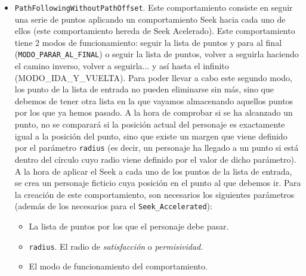 \begin{itemize}
 \item \texttt{PathFollowingWithoutPathOffset}. Este comportamiento consiste en seguir una serie de puntos aplicando un comportamiento Seek hacia cada uno de ellos (este comportamiento hereda de Seek Acelerado). Este comportamiento tiene 2 modos de funcionamiento: seguir la lista de puntos y para al final (\texttt{MODO\_PARAR\_AL\_FINAL}) o seguir la lista de puntos, volver a seguirla haciendo el camino inverso, volver a seguirla... y así hasta el infinito (MODO\_IDA\_Y\_VUELTA). Para poder llevar a cabo este segundo modo, los punto de la lista de entrada no pueden eliminarse sin más, sino que debemos de tener otra lista en la que vayamos almacenando aquellos puntos por los que ya hemos pasado. A la hora de comprobar si se ha alcanzado un punto, no se comparará si la posición actual del personaje es exactamente igual a la posición del punto, sino que existe un margen que viene definido por el parámetro \texttt{radius} (es decir, un personaje ha llegado a un punto si está dentro del círculo cuyo radio viene definido por el valor de dicho parámetro). A la hora de aplicar el Seek a cada uno de los puntos de la lista de entrada, se crea un personaje ficticio cuya posición en el punto al que debemos ir. Para la creación de este comportamiento, son necesarios los siguientes parámetros (además de los necesarios para el \texttt{Seek\_Accelerated}):
 \begin{itemize}
 	\item La lista de puntos por los que el personaje debe pasar.
 	\item \texttt{radius}. El radio de \textit{satisfacción} o \textit{permisividad}.
 	\item El modo de funcionamiento del comportamiento.
 \end{itemize}
 

\end{itemize}
